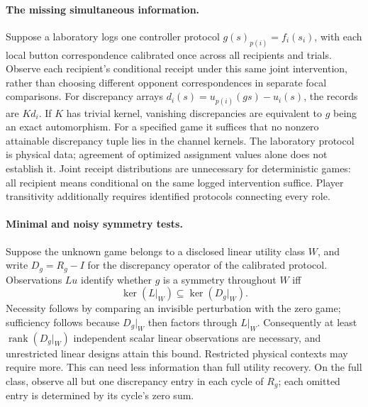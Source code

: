\paragraph{The missing simultaneous information.}
Suppose a laboratory logs one controller protocol
$g(s)_{p(i)}=f_i(s_i)$, with each local button correspondence calibrated once
across all recipients and trials. Observe each recipient's conditional receipt
under this same joint intervention, rather than choosing different opponent
correspondences in separate focal comparisons. For discrepancy arrays
$d_i(s)=u_{p(i)}(gs)-u_i(s)$, the records are $Kd_i$.
If $K$ has trivial kernel, vanishing discrepancies are equivalent to $g$
being an exact automorphism. For a specified game it suffices that no nonzero
attainable discrepancy tuple lies in the channel kernels. The laboratory
protocol is physical data; agreement of optimized assignment values alone
does not establish it. Joint receipt distributions are unnecessary for
deterministic games: all recipient means conditional on the same logged
intervention suffice. Player transitivity additionally requires identified
protocols connecting every role.

\paragraph{Minimal and noisy symmetry tests.}
Suppose the unknown game belongs to a disclosed linear utility class $W$,
and write $D_g=R_g-I$ for the discrepancy operator of the calibrated protocol.
Observations $Lu$ identify whether $g$ is a symmetry throughout $W$ iff
\[
 \ker(L|_W)\subseteq\ker(D_g|_W).
\]
Necessity follows by comparing an invisible perturbation with the zero game;
sufficiency follows because $D_g|_W$ then factors through $L|_W$.
Consequently at least $\operatorname{rank}(D_g|_W)$ independent scalar
linear observations are necessary, and unrestricted linear designs attain
this bound. Restricted physical contexts may require more. This can need
less information than full utility recovery. On the full class, observe
all but one discrepancy entry in each cycle of $R_g$; each omitted entry
is determined by its cycle's zero sum.

